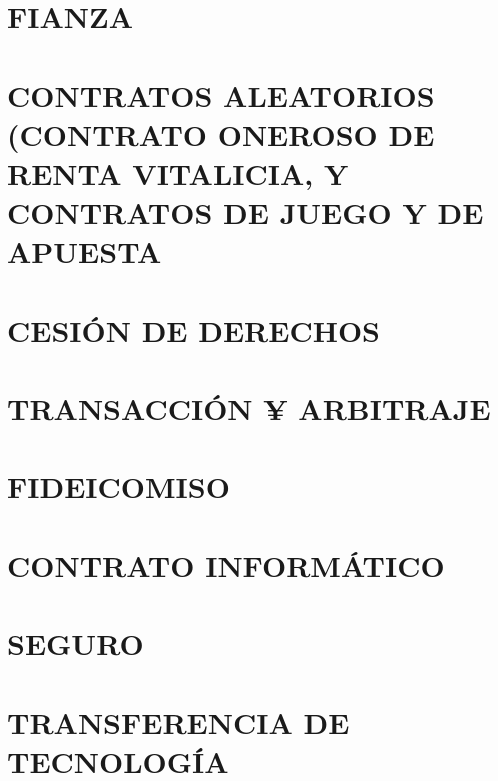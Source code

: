\documentclass[12pt]{book}
\begin{document}
\chapter{FIANZA}
\chapter{CONTRATOS ALEATORIOS (CONTRATO ONEROSO DE RENTA VITALICIA, Y CONTRATOS DE JUEGO Y DE APUESTA}
\chapter{CESIÓN DE DERECHOS}
\chapter{TRANSACCIÓN ¥ ARBITRAJE}
\chapter{FIDEICOMISO}
\chapter{CONTRATO INFORMÁTICO}
\chapter{SEGURO}
\chapter{TRANSFERENCIA DE TECNOLOGÍA}
\end{document}
